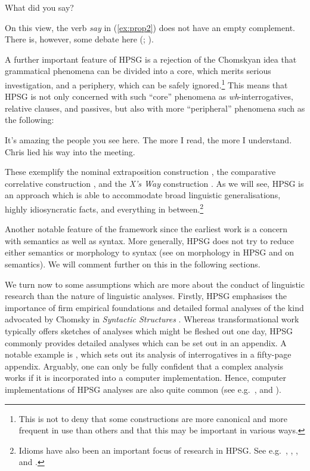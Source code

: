 \documentclass[output=paper
	        ,collection
	        ,collectionchapter
 	        ,biblatex
                ,babelshorthands
                ,newtxmath
                ,draftmode
                ,colorlinks, citecolor=brown
]{langscibook}
\begin{document}
\ea\label{ex:prop2}
What did you say?
\z

\noindent
On this view, the verb \emph{say} in (\ref{ex:prop2}) does not have an empty complement. There is,
however, some debate here (\citealp{SF94a,Mueller2004e};
).

A further important feature of HPSG is a rejection of the Chomskyan idea that grammatical phenomena can be divided into a core, which merits serious investigation, and a periphery, which can be safely ignored.\footnote{%
  This is not to deny that some constructions are more canonical and more frequent in use than others and that this may be important in various ways.}
%
This means that HPSG is not only concerned with such ``core'' phenomena as \emph{wh}-interrogatives, relative clauses, and passives, but also with more ``peripheral'' phenomena such as the following:


\eal\label{ex:prop3}
\ex\label{ex:prop3a}
It’s amazing the people you see here.
\ex\label{ex:prop3b}
The more I read, the more I understand.
\ex\label{ex:prop3c}
Chris lied his way into the meeting.
\zl

\noindent
These exemplify the nominal extraposition construction \citep{ML96a}, the comparative correlative
construction \citep{Abeille2006a,AB2008a-u,Borsley2011a-u}, and the \emph{X’s Way} construction
\citep[Section~7.4]{Sag2012a}. As we will see, HPSG is an approach which is able to accommodate
broad linguistic generalisations, highly idiosyncratic facts, and everything in between.\footnote{%
  Idioms have also been an important focus of research in HPSG. See e.g.\
  , , , and
  \crossrefchaptert{idioms}.} 
%

Another notable feature of the framework since the earliest work is a concern with semantics as well
as syntax. More generally, HPSG does not try to reduce either semantics or morphology to syntax (see
\crossrefchapteralt{morphology} on morphology in HPSG and \crossrefchapteralt{semantics} on
semantics). We will comment further on this in the following sections. 

We turn now to some assumptions which are more about the conduct of linguistic research than the
nature of linguistic analyses. Firstly, HPSG emphasises the importance of firm empirical foundations
and detailed formal analyses of the kind advocated by Chomsky in \emph{Syntactic Structures}
\citep[\page 5]{Chomsky57a}. Whereas transformational work typically offers sketches of analyses
which might be fleshed out one day, HPSG commonly provides detailed analyses which can be set out in
an appendix. A notable example is \citet{GSag2000a-u}, which sets out its analysis of \ili{English}
interrogatives in a fifty-page appendix. Arguably, one can only be fully confident that a complex
analysis works if it is incorporated into a computer implementation. Hence, computer implementations
of HPSG analyses are also quite common (see e.g.\
\citealp{Babel,MuellerCoreGram,Copestake2002a,BDFPS2010a-u,Bender2016}, and
\crossrefchapteralp{cl}). 
\end{document}
